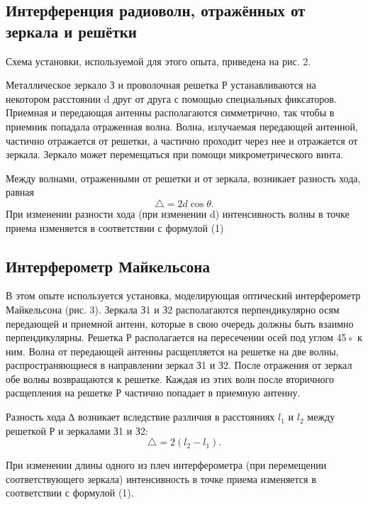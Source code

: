 \documentclass[a4paper,12pt]{article}
\begin{document}
\subsection{Интерференция радиоволн, отражённых от зеркала и решётки}
Схема установки, используемой для этого опыта, приведена на рис. 2. \par
Металлическое зеркало З и проволочная решетка Р устанавливаются на некотором расстоянии d
друг от друга с помощью специальных фиксаторов. Приемная и передающая антенны располагаются
симметрично, так чтобы в приемник попадала отраженная волна.
Волна, излучаемая передающей антенной, частично отражается от решетки, а частично проходит через нее и отражается от зеркала. Зеркало может перемещаться при помощи микрометрического винта. \par 
Между волнами, отраженными от решетки и от зеркала, возникает разность хода, равная
\begin{equation}
    \triangle = 2 d \cos \theta.
\end{equation}
При изменении разности хода (при изменении d) интенсивность волны в точке приема изменяется в соответствии с формулой (1)

\subsection{Интерферометр Майкельсона}
В этом опыте используется установка, моделирующая оптический интерферометр Майкельсона (рис. 3). Зеркала З1 и З2 располагаются перпендикулярно осям
передающей и приемной антенн, которые в свою очередь должны быть взаимно перпендикулярны. Решетка Р располагается на пересечении осей под углом 45◦ к ним. Волна от передающей антенны
расщепляется на решетке на две волны, распространяющиеся в направлении зеркал З1 и З2. После отражения от зеркал обе волны
возвращаются к решетке. Каждая из этих волн после вторичного расщепления на решетке Р частично попадает в приемную антенну. \par

Разность хода ∆ возникает вследствие различия в расстояниях
$l_1$ и $l_2$ между решеткой Р и зеркалами З1 и З2:
\begin{equation}
    \triangle = 2 (l_2 - l_1).
\end{equation}

При изменении длины одного из плеч интерферометра (при перемещении соответствующего зеркала) интенсивность в точке
приема изменяется в соответствии с формулой (1). \par
\end{document}
